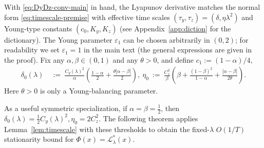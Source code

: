 \documentclass{article}
\newcommand{\1}{\mathbf{1}}
\begin{document}
With \eqref{eq:DyDz-conv-main} in hand, the Lyapunov derivative matches the normal form \eqref{eq:timescale-premise}
with effective time scales $(\tau_y,\tau_z)=(\delta,\eta\lambda^2)$ and Young-type constants $(c_0,K_y,K_z)$
(see Appendix~\ref{app:diction} for the dictionary).
The Young parameter $\varepsilon_1$ can be chosen arbitrarily in $(0,2)$; for readability we set $\varepsilon_1=1$
in the main text (the general expressions are given in the proof). Fix any $\alpha,\beta\in(0,1)$ and any $\theta>0$, and define $c_1:=(1-\alpha)/4,$
\begin{align}
\delta_0(\lambda)
\ &:=\ \frac{C_y(\lambda)^2}{\alpha}
\left(\frac{1-\alpha}{2}+\frac{\theta|\alpha-\beta|}{2}\right), \
\eta_0
\ :=\ \frac{C_z^2}{\beta}
\left(\beta+\frac{(1-\beta)^2}{1-\alpha}+\frac{|\alpha-\beta|}{2\theta}\right).
\label{eq:eta0-bilevel}
\end{align}
Here $\theta>0$ is only a Young-balancing parameter.  

As a useful symmetric specialization, if $\alpha=\beta=\tfrac12$, then $\delta_0(\lambda)=\tfrac12 C_y(\lambda)^2, \eta_0=2C_z^2$.
The following theorem applies Lemma~\ref{lem:timescale} with these thresholds to obtain the fixed-$\lambda$ $O(1/T)$ stationarity bound for $\Phi(x)=\mathcal L_\lambda^*(x)$.

\end{document}
